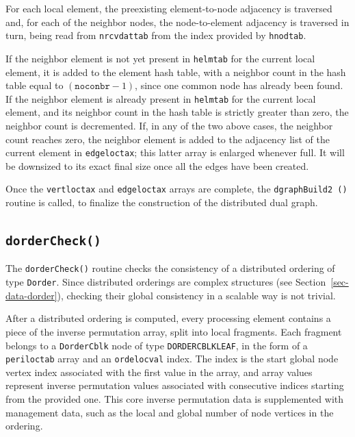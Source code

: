 For each local element, the preexisting element-to-node adjacency is
traversed and, for each of the neighbor nodes, the node-to-element
adjacency is traversed in turn, being read from
\texttt{nrcv\lbt dat\lbt tab} from the index provided by
\texttt{hnodtab}.

If the neighbor element is not yet present in \texttt{helmtab} for the
current local element, it is added to the element hash table, with a
neighbor count in the hash table equal to $(\texttt{noconbr} - 1)$,
since one common node has already been found. If the neighbor element
is already present in \texttt{helmtab} for the current local element,
and its neighbor count in the hash table is strictly greater than
zero, the neighbor count is decremented. If, in any of the two above
cases, the neighbor count reaches zero, the neighbor element is added
to the adjacency list of the current element in
\texttt{edge\lbt loc\lbt tax}; this latter array is enlarged whenever
full. It will be downsized to its exact final size once all the edges
have been created.

Once the \texttt{vert\lbt loc\lbt tax} and
\texttt{edge\lbt loc\lbt tax} arrays are complete, the
\texttt{dgraphBuild2\,()} routine is called, to finalize the
construction of the distributed dual graph.

\subsection{\texttt{dorderCheck()}}

The \texttt{dorderCheck()} routine checks the consistency of a
distributed ordering of type \texttt{Dorder}. Since distributed
orderings are complex structures (see Section~\ref{sec-data-dorder}),
checking their global consistency in a scalable way is not trivial.

After a distributed ordering is computed, every processing element
contains a piece of the inverse permutation array, split into local
fragments. Each fragment belongs to a \texttt{Dorder\lbt Cblk} node of
type \texttt{DORDER\lbt CBLK\lbt LEAF}, in the form of a
\texttt{peri\lbt loc\lbt tab} array and an
\texttt{orde\lbt loc\lbt val} index. The index is the start global
node vertex index associated with the first value in the array, and
array values represent inverse permutation values associated with
consecutive indices starting from the provided one. This core
inverse permutation data is supplemented with management data, such as
the local and global number of node vertices in the ordering.


